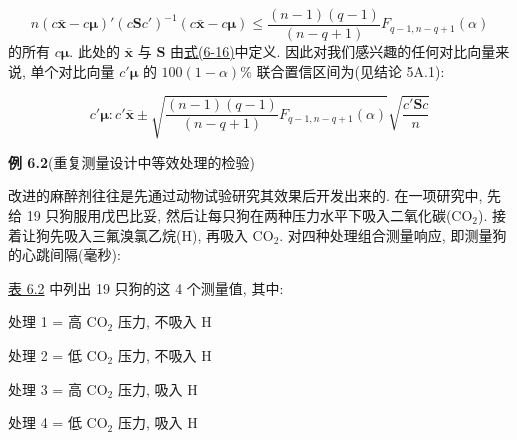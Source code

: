 \label{eq:6-17}
\begin{equation}
n(c\bar{\mathbf{x}}-c\boldsymbol{\mu})'(c\mathbf{S}c')^{-1}(c\bar{\mathbf{x}}-c\boldsymbol{\mu})
\le \frac{(n-1)(q-1)}{(n-q+1)}F_{q-1,n-q+1}(\alpha)
\tag{6-17}
\end{equation}
的所有 $c\boldsymbol{\mu}$. 此处的 $\bar{\mathbf{x}}$ 与 $\mathbf{S}$ 由\hyperref[eq:6-16]{式(6-16)}中定义. 因此对我们感兴趣的任何对比向量来说, 单个对比向量 $c'\boldsymbol{\mu}$ 的 $100(1-\alpha)\%$ 联合置信区间为(见结论 5A.1):

\label{eq:6-18}
\begin{equation}
c'\boldsymbol{\mu}: c'\bar{\mathbf{x}} \pm \sqrt{\frac{(n-1)(q-1)}{(n-q+1)}F_{q-1,n-q+1}(\alpha)}\sqrt{\frac{c'\mathbf{S}c}{n}}
\tag{6-18}
\end{equation}

\noindent\textbf{例 6.2}\quad (重复测量设计中等效处理的检验)

改进的麻醉剂往往是先通过动物试验研究其效果后开发出来的. 在一项研究中, 先给 19 只狗服用戊巴比妥, 然后让每只狗在两种压力水平下吸入二氧化碳($\mathrm{CO}_{2}$). 接着让狗先吸入三氟溴氯乙烷(H), 再吸入 $\mathrm{CO}_{2}$. 对四种处理组合测量响应, 即测量狗的心跳间隔(毫秒):

\begin{mvfigure}
\centering
{}
\end{mvfigure}

\hyperref[tab:6.2]{表 6.2} 中列出 19 只狗的这 4 个测量值, 其中:

处理 1 = 高 $\mathrm{CO}_{2}$ 压力, 不吸入 H

处理 2 = 低 $\mathrm{CO}_{2}$ 压力, 不吸入 H

处理 3 = 高 $\mathrm{CO}_{2}$ 压力, 吸入 H

处理 4 = 低 $\mathrm{CO}_{2}$ 压力, 吸入 H

